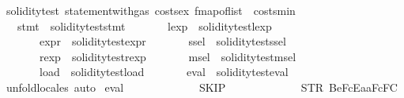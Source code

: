 \begin{isabellebody}
\isanewline
{}\isamarkupfalse%
\ soliditytest{}{\isacharcolon}{\kern0pt}\ statement{\isacharunderscore}{\kern0pt}with{\isacharunderscore}{\kern0pt}gas\ costs{\isacharunderscore}{\kern0pt}ex\ {\isachardoublequoteopen}fmap{\isacharunderscore}{\kern0pt}of{\isacharunderscore}{\kern0pt}list\ {\isacharbrackleft}{\kern0pt}{\isacharbrackright}{\kern0pt}{\isachardoublequoteclose}\ costs{\isacharunderscore}{\kern0pt}min\isanewline
\ \ \ stmt{}\ {\isacharequal}{\kern0pt}\ {\isachardoublequoteopen}soliditytest{}{\isachardot}{\kern0pt}stmt{\isachardoublequoteclose}\isanewline
\ \ \ \ \ \ \ lexp{}\ {\isacharequal}{\kern0pt}\ soliditytest{}{\isachardot}{\kern0pt}lexp\ \isanewline
\ \ \ \ \ \ \ expr{}\ {\isacharequal}{\kern0pt}\ soliditytest{}{\isachardot}{\kern0pt}expr\isanewline
\ \ \ \ \ \ \ ssel{}\ {\isacharequal}{\kern0pt}\ soliditytest{}{\isachardot}{\kern0pt}ssel\isanewline
\ \ \ \ \ \ \ rexp{}\ {\isacharequal}{\kern0pt}\ soliditytest{}{\isachardot}{\kern0pt}rexp\isanewline
\ \ \ \ \ \ \ msel{}\ {\isacharequal}{\kern0pt}\ soliditytest{}{\isachardot}{\kern0pt}msel\isanewline
\ \ \ \ \ \ \ load{}\ {\isacharequal}{\kern0pt}\ soliditytest{}{\isachardot}{\kern0pt}load\isanewline
\ \ \ \ \ \ \ eval{}\ {\isacharequal}{\kern0pt}\ soliditytest{}{\isachardot}{\kern0pt}eval\isanewline
%
\isadelimproof
\ \ %
\endisadelimproof
%
\isatagproof
{}\isamarkupfalse%
\ unfold{\isacharunderscore}{\kern0pt}locales\ auto%
\endisatagproof
{\isafoldproof}%
%
\isadelimproof
\isanewline
%
\endisadelimproof
\isanewline
{}\isamarkupfalse%
\ {\isachardoublequoteopen}eval{}\ {}{}{}{}\isanewline
\ \ \ \ \ \ \ \ \ \ \ \ SKIP\ \isanewline
\ \ \ \ \ \ \ \ \ \ \ \ {\isacharparenleft}{\kern0pt}STR\ {\isacharprime}{\kern0pt}{\isacharprime}{\kern0pt}{}{}{}Be{}{}{}{}FcEa{}{}aF{}{}{}{}{}{}{}{}{}c{}{}F{}{}{}{}{}{}C{}{}{}{\isacharprime}{\kern0pt}{\isacharprime}{\kern0pt}{\isacharparenright}{\kern0pt}\isanewline

\end{isabellebody}
